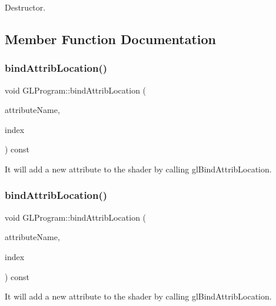 Destructor. 

\subsection{Member Function Documentation}
\mbox{\label{classGLProgram_a06fab65fe4aa591530f2b5e61516756c}} 
\subsubsection{\texorpdfstring{bind\+Attrib\+Location()}{bindAttribLocation()}\hspace{0.1cm}{\footnotesize\ttfamily [1/2]}}
{\footnotesize\ttfamily void G\+L\+Program\+::bind\+Attrib\+Location (\begin{DoxyParamCaption}\item[{const std\+::string \&}]{attribute\+Name,  }\item[{G\+Luint}]{index }\end{DoxyParamCaption}) const}

It will add a new attribute to the shader by calling gl\+Bind\+Attrib\+Location. \mbox{\label{classGLProgram_a06fab65fe4aa591530f2b5e61516756c}} 
\subsubsection{\texorpdfstring{bind\+Attrib\+Location()}{bindAttribLocation()}\hspace{0.1cm}{\footnotesize\ttfamily [2/2]}}
{\footnotesize\ttfamily void G\+L\+Program\+::bind\+Attrib\+Location (\begin{DoxyParamCaption}\item[{const std\+::string \&}]{attribute\+Name,  }\item[{G\+Luint}]{index }\end{DoxyParamCaption}) const}

It will add a new attribute to the shader by calling gl\+Bind\+Attrib\+Location. \mbox{\label{classGLProgram_a04b7cb22e180a7da65e7eecd4f253b9c}} 
